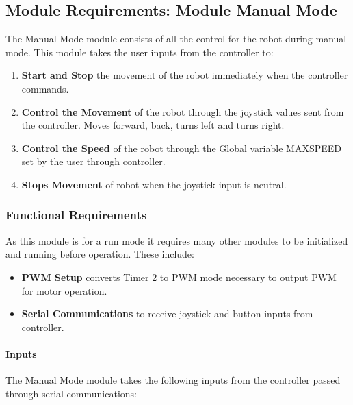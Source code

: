 \documentclass[MTRX3700report.tex]{subfiles}
\begin{document}
	
	\subsection{Module Requirements: Module Manual Mode}
	
	The Manual Mode module consists of all the control for the robot during manual mode. This module takes the user inputs from the controller to:
	
	\begin{enumerate}
		\item \textbf{Start and Stop} the movement of the robot immediately when the controller commands.
		\item \textbf{Control the Movement} of the robot through the joystick values sent from the controller. Moves forward, back, turns left and turns right.
		\item \textbf{Control the Speed} of the robot through the Global variable MAX\textunderscore SPEED set by the user through controller.
		\item \textbf{Stops Movement} of robot when the joystick input is neutral.	
	\end{enumerate} 
	
	\subsubsection{Functional Requirements}
	As this module is for a run mode it requires many other modules to be initialized and running before operation. These include:
	
	\begin{itemize}
		\item \textbf{PWM Setup} converts Timer 2 to PWM mode necessary to output PWM for motor operation.
		\item \textbf{Serial Communications} to receive joystick and button inputs from controller.
	\end{itemize} 
	
	
	\paragraph{Inputs}
	
	The Manual Mode module takes the following inputs from the controller passed through serial communications:
	
\end{document}
